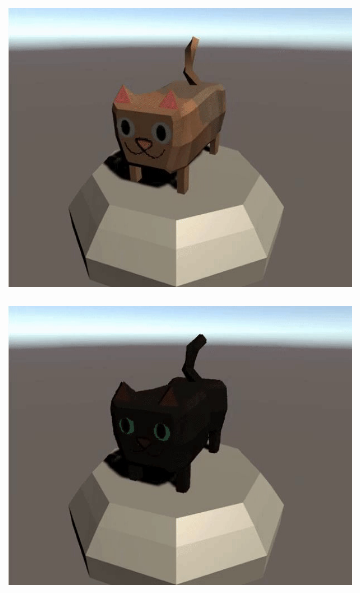 \begin{figure}[H]
    \begin{center}
        \begin{subfigure}[b]{0.24\textwidth}
            \includegraphics[width=\textwidth]{img/cat1.jpg}
        \end{subfigure}
        \hfill
        \begin{subfigure}[b]{0.24\textwidth}
            \includegraphics[width=\textwidth]{img/cat2.jpg}
        \end{subfigure}
        \hfill
        \begin{subfigure}[b]{0.24\textwidth}

\end{subfigure}
\end{center}
\end{figure}
